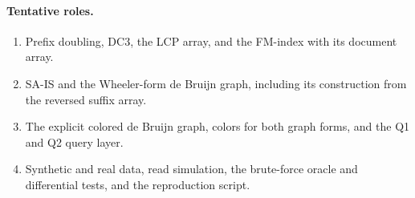 \documentclass[a4paper,11pt]{article}
\theoremstyle{definition}
\begin{document}
\paragraph{Tentative roles.}
\begin{enumerate}[itemsep=1pt]
\item Prefix doubling, DC3, the LCP array, and the FM-index with its document array.
\item SA-IS and the Wheeler-form de Bruijn graph, including its construction from the reversed suffix array.
\item The explicit colored de Bruijn graph, colors for both graph forms, and the Q1 and Q2 query layer.
\item Synthetic and real data, read simulation, the brute-force oracle and differential tests, and the reproduction script.
\end{enumerate}

\clearpage




\end{document}
